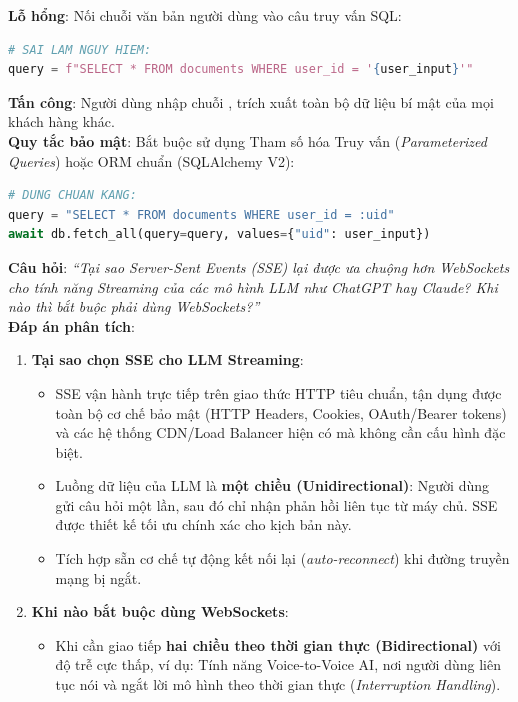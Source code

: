 \begin{securitybox}
\textbf{Lỗ hổng}: Nối chuỗi văn bản người dùng vào câu truy vấn SQL:
\begin{lstlisting}[language=Python]
# SAI LAM NGUY HIEM:
query = f"SELECT * FROM documents WHERE user_id = '{user_input}'"
\end{lstlisting}
\textbf{Tấn công}: Người dùng nhập chuỗi , trích xuất toàn bộ dữ liệu bí mật của mọi khách hàng khác.\\
\textbf{Quy tắc bảo mật}: Bắt buộc sử dụng Tham số hóa Truy vấn (\textit{Parameterized Queries}) hoặc ORM chuẩn (SQLAlchemy V2):
\begin{lstlisting}[language=Python]
# DUNG CHUAN KANG:
query = "SELECT * FROM documents WHERE user_id = :uid"
await db.fetch_all(query=query, values={"uid": user_input})
\end{lstlisting}
\end{securitybox}

\begin{interviewbox}
\textbf{Câu hỏi}: \textit{``Tại sao Server-Sent Events (SSE) lại được ưa chuộng hơn WebSockets cho tính năng Streaming của các mô hình LLM như ChatGPT hay Claude? Khi nào thì bắt buộc phải dùng WebSockets?''}\\
\textbf{Đáp án phân tích}:
\begin{enumerate}
  \item \textbf{Tại sao chọn SSE cho LLM Streaming}:
    \begin{itemize}
      \item SSE vận hành trực tiếp trên giao thức HTTP tiêu chuẩn, tận dụng được toàn bộ cơ chế bảo mật (HTTP Headers, Cookies, OAuth/Bearer tokens) và các hệ thống CDN/Load Balancer hiện có mà không cần cấu hình đặc biệt.
      \item Luồng dữ liệu của LLM là \textbf{một chiều (Unidirectional)}: Người dùng gửi câu hỏi một lần, sau đó chỉ nhận phản hồi liên tục từ máy chủ. SSE được thiết kế tối ưu chính xác cho kịch bản này.
      \item Tích hợp sẵn cơ chế tự động kết nối lại (\textit{auto-reconnect}) khi đường truyền mạng bị ngắt.
    \end{itemize}
  \item \textbf{Khi nào bắt buộc dùng WebSockets}:
    \begin{itemize}
      \item Khi cần giao tiếp \textbf{hai chiều theo thời gian thực (Bidirectional)} với độ trễ cực thấp, ví dụ: Tính năng Voice-to-Voice AI, nơi người dùng liên tục nói và ngắt lời mô hình theo thời gian thực (\textit{Interruption Handling}).
    \end{itemize}
\end{enumerate}
\end{interviewbox}

